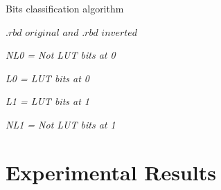 \begin{algorithm}
\caption{Bits classification algorithm}
\begin{algorithmic}
\label{BCA}
\REQUIRE $.rbd$ $original$ $and$ $.rbd$ $inverted$ \\
\vspace{0.20 cm }

\vspace{0.10 cm }

\STATE \textit{ NL0 = Not LUT bits at 0}
\vspace{0.10 cm }

\vspace{0.10 cm }

\STATE \textit{ L0 = LUT bits at 0}
\vspace{0.10 cm }

\vspace{0.10 cm }

\STATE \textit{ L1 =  LUT bits at 1}
\vspace{0.10 cm }

\vspace{0.10 cm }

\STATE \textit{ NL1 = Not LUT bits at 1}
\vspace{0.10 cm }




\ENDIF
\vspace{0.20 cm }

\end{algorithmic}
\end{algorithm}

















\section{Experimental Results}
\label{Experimental Results}


